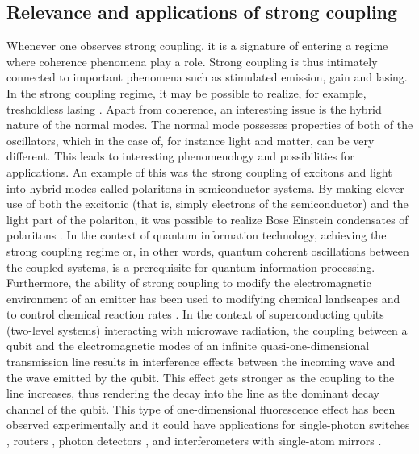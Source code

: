 \documentclass[12pt]{iopart}
\begin{document}
\subsection{Relevance and applications of strong coupling}

Whenever one observes strong coupling, it is a signature of entering a regime where coherence phenomena play a role. Strong coupling is thus intimately connected to important phenomena such as stimulated emission, gain and lasing. In the strong coupling regime, it may be possible to realize, for example, tresholdless lasing \cite{Rice1994}.  Apart from coherence, an interesting issue is the hybrid nature of the normal modes. The normal mode possesses properties of both of the oscillators, which in the case of, for instance light and matter, can be very different. This leads to interesting phenomenology and possibilities for applications. An example of this was the strong coupling of excitons and light into hybrid modes called polaritons in semiconductor systems. By making clever use of both the excitonic (that is, simply electrons of the semiconductor) and the light part of the polariton, it was possible to realize Bose Einstein condensates of polaritons \cite{Kasprzak2006}. In the context of quantum information technology, achieving the strong coupling regime or, in other words, quantum coherent oscillations between the coupled systems, is a prerequisite for quantum information processing. Furthermore, the ability of strong coupling to modify the electromagnetic environment of an emitter has been used to modifying chemical landscapes and to control chemical reaction rates \cite{Hutchison2012}. In the context of superconducting qubits (two-level systems) interacting with microwave radiation, the coupling between a qubit and the electromagnetic modes of an infinite quasi-one-dimensional transmission line results in interference effects between the incoming wave and the wave emitted by the qubit. This effect gets stronger as the coupling to the line increases, thus rendering the decay into the line as the dominant decay channel of the qubit. This type of one-dimensional fluorescence effect has been observed experimentally \cite{Astafiev2010} and it could have applications for single-photon switches \cite{Li2012}, routers \cite{Hoi2011}, photon detectors \cite{Romero2009}, and interferometers with single-atom 
mirrors \cite{Paraoanu2010}.
\end{document}
